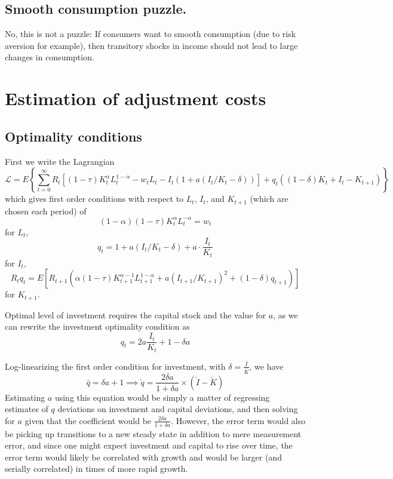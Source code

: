 \documentclass[11pt]{amsart}
\begin{document}
\subsection{Smooth consumption puzzle.}
No, this is not a puzzle: If consumers want to smooth consumption (due to risk aversion for example), then transitory shocks in income should not lead to large changes in consumption.

\section{Estimation of adjustment costs}

\subsection{Optimality conditions}

First we write the Lagrangian
\[
\mathcal{L} = E \left\{ \sum_{t=0}^{\infty} R_t \left[(1 - \tau) K_t^{\alpha} L_t^{1-\alpha} - w_t L_t - I_t \left(1 + a(I_t / K_t - \delta) \right) \right] + q_t ((1-\delta) K_t + I_t - K_{t+1}) \right\}
\]
which gives first order conditions with respect to $L_t$, $I_t$, and $K_{t+1}$ (which are chosen each period) of
\[
(1-\alpha)(1 - \tau) K_t^{\alpha} L_t^{-\alpha} = w_t
\]
for $L_t$,
\[
q_t = 1 + a(I_t / K_t - \delta) + a \cdot \frac{I_t}{K_t}
\]
for $I_t$,
\[
R_t q_t = E \left[ R_{t+1} (\alpha (1-\tau) K_{t+1}^{\alpha-1} L_{t+1}^{1-\alpha} + a(I_{t+1} / K_{t+1})^2 + (1-\delta) q_{t+1} )\right]
\]
for $K_{t+1}$.

Optimal level of investment requires the capital stock and the value for $a$, as we can rewrite the investment optimality condition as
\[
q_t = 2a \frac{I_t}{K_t} + 1 - \delta a
\]


Log-linearizing the first order condition for investment, with $\delta = \frac{\bar{I}}{\bar{K}}$, we have
\[
\bar{q} = \delta a + 1 \implies \check{q} = \frac{2 \delta a}{1 + \delta a} \times (\check{I} - \check{K})
\]
Estimating $a$ using this equation would be simply a matter of regressing estimates of $q$ deviations on investment and capital deviations, and then solving for $a$ given that the coefficient would be $\frac{2 \delta a}{1 + \delta a}$. However, the error term would also be picking up transitions to a new steady state in addition to mere measurement error, and since one might expect investment and capital to rise over time, the error term would likely be correlated with growth and would be larger (and serially correlated) in times of more rapid growth.
\end{document}
